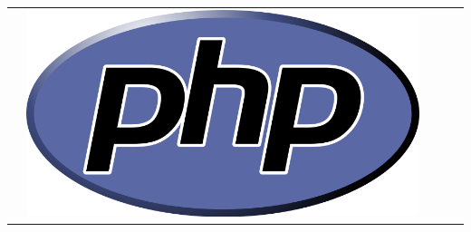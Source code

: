 \documentclass[a4paper,12pt,openany,oneside]{book}
\begin{document}
\begin{table}[!ht]
\centering
\begin{tabular}{| l | l | l | l | l |}
\hline
\rowcolor{green!50}
 & \includegraphics[scale=0.08]{images/icons/php.png} & \includegraphics[sc
\end{tabular}
\end{table}
\end{document}
